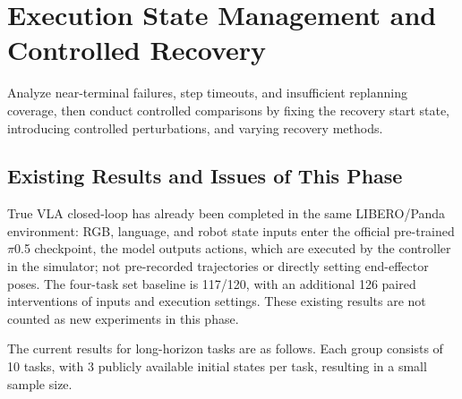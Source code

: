 

\FloatBarrier

\section{Execution State Management and Controlled Recovery}

\label{stage:s10}

Analyze near-terminal failures, step timeouts, and insufficient replanning coverage, then conduct controlled comparisons by fixing the recovery start state, introducing controlled perturbations, and varying recovery methods.

\subsection{Existing Results and Issues of This Phase}\label{s10-detail-1}

True VLA closed-loop has already been completed in the same LIBERO/Panda environment: RGB, language, and robot state inputs enter the official pre-trained \(\pi\)0.5 checkpoint, the model outputs actions, which are executed by the controller in the simulator; not pre-recorded trajectories or directly setting end-effector poses. The four-task set baseline is 117/120, with an additional 126 paired interventions of inputs and execution settings. These existing results are not counted as new experiments in this phase.

The current results for long-horizon tasks are as follows. Each group consists of 10 tasks, with 3 publicly available initial states per task, resulting in a small sample size.

